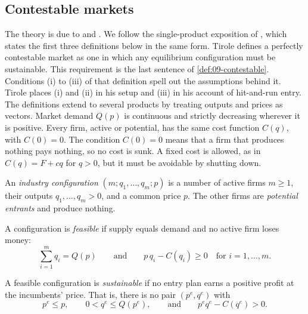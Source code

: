\subsection{Contestable markets}\label{sec:09-contestable}

The theory is due to \citet{BaumolPanzarWillig1982} and \citet{Baumol1982}. We follow the single-product
exposition of \citet[sec.~8.1.2]{Tirole1988}, which states the first three definitions below in the same form.
Tirole defines a perfectly contestable market as one in which any equilibrium configuration must be
sustainable. This requirement is the last sentence of \cref{def:09-contestable}. Conditions (i) to (iii) of
that definition spell out the assumptions behind it. Tirole places (i) and (ii) in his setup and (iii) in his
account of hit-and-run entry. The definitions extend to several products by treating outputs and prices as vectors. Market demand $Q(p)$ is
continuous and strictly decreasing wherever it is positive. Every firm, active or potential, has the same cost
function $C(q)$, with $C(0) = 0$. The condition $C(0) = 0$ means that a firm that produces nothing
pays nothing, so no cost is sunk. A fixed cost is allowed, as in $C(q) = F + cq$ for $q > 0$, but it must be
avoidable by shutting down.

\begin{definition}\label{def:09-configuration}
An \emph{industry configuration} $(m; q_1, \dots, q_m; p)$ is a number of active firms $m \ge 1$, their outputs
$q_1, \dots, q_m > 0$, and a common price $p$. The other firms are \emph{potential entrants} and produce nothing.
\end{definition}

\begin{definition}\label{def:09-feasible}
A configuration is \emph{feasible} if supply equals demand and no active firm loses money:
\begin{equation*}
  \sum_{i=1}^m q_i = Q(p) \qquad\text{and}\qquad p\,q_i - C(q_i) \ge 0 \quad\text{for } i = 1, \dots, m.
\end{equation*}
\end{definition}

\begin{definition}\label{def:09-sustainable}
A feasible configuration is \emph{sustainable} if no entry plan earns a positive profit at the incumbents'
price. That is, there is no pair $(p^e, q^e)$ with
\begin{equation*}
  p^e \le p, \qquad 0 < q^e \le Q(p^e), \qquad\text{and}\qquad p^e q^e - C(q^e) > 0.
\end{equation*}
\end{definition}

